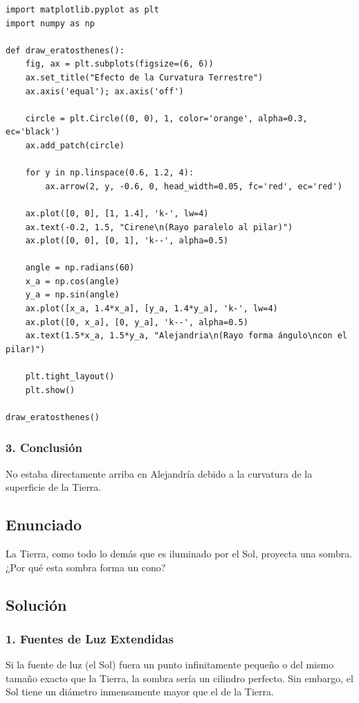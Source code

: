 \documentclass[12pt, a4paper]{article}
\begin{document}
\begin{lstlisting}
import matplotlib.pyplot as plt
import numpy as np

def draw_eratosthenes():
    fig, ax = plt.subplots(figsize=(6, 6))
    ax.set_title("Efecto de la Curvatura Terrestre")
    ax.axis('equal'); ax.axis('off')
    
    circle = plt.Circle((0, 0), 1, color='orange', alpha=0.3, ec='black')
    ax.add_patch(circle)
    
    for y in np.linspace(0.6, 1.2, 4):
        ax.arrow(2, y, -0.6, 0, head_width=0.05, fc='red', ec='red')
    
    ax.plot([0, 0], [1, 1.4], 'k-', lw=4)
    ax.text(-0.2, 1.5, "Cirene\n(Rayo paralelo al pilar)")
    ax.plot([0, 0], [0, 1], 'k--', alpha=0.5)
    
    angle = np.radians(60) 
    x_a = np.cos(angle)
    y_a = np.sin(angle)
    ax.plot([x_a, 1.4*x_a], [y_a, 1.4*y_a], 'k-', lw=4)
    ax.plot([0, x_a], [0, y_a], 'k--', alpha=0.5)
    ax.text(1.5*x_a, 1.5*y_a, "Alejandria\n(Rayo forma ángulo\ncon el pilar)")
    
    plt.tight_layout()
    plt.show()

draw_eratosthenes()
\end{lstlisting}

\subsubsection*{3. Conclusión}
No estaba directamente arriba en Alejandría debido a la curvatura de la superficie de la Tierra.

\newpage

\subsection*{Enunciado}
La Tierra, como todo lo demás que es iluminado por el Sol, proyecta una sombra. ¿Por qué esta sombra forma un cono?

\subsection*{Solución}

\subsubsection*{1. Fuentes de Luz Extendidas}
Si la fuente de luz (el Sol) fuera un punto infinitamente pequeño o del mismo tamaño exacto que la Tierra, la sombra sería un cilindro perfecto. Sin embargo, el Sol tiene un diámetro inmensamente mayor que el de la Tierra.
\end{document}
